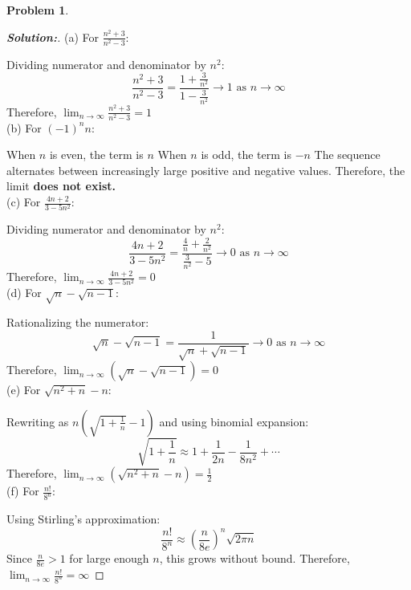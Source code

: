 \documentclass[12pt]{article}
\theoremstyle{definition}\newtheorem{problem}{Problem}
\newenvironment{solution}{\begin{proof}[\bfseries\textup{Solution:}]}{\end{proof}}
\begin{document}
\newpage
\begin{problem}
\end{problem}
\begin{solution}
    
(a) For $\displaystyle \frac{n^2+3}{n^2-3}$:
    
Dividing numerator and denominator by $n^2$:
\[ \frac{n^2+3}{n^2-3} = \frac{1 + \frac{3}{n^2}}{1 - \frac{3}{n^2}} \to 1 \text{ as } n \to \infty \]
Therefore, $\lim_{n \to \infty} \frac{n^2+3}{n^2-3} = 1$
\\

(b) For $(-1)^n n$:

When $n$ is even, the term is $n$
When $n$ is odd, the term is $-n$
The sequence alternates between increasingly large positive and negative values.
Therefore, the limit \textbf{does not exist.}
\\

(c) For $\displaystyle \frac{4n+2}{3-5n^2}$:

Dividing numerator and denominator by $n^2$:
\[ \frac{4n+2}{3-5n^2} = \frac{\frac{4}{n} + \frac{2}{n^2}}{\frac{3}{n^2} - 5} \to 0 \text{ as } n \to \infty \]
Therefore, $\lim_{n \to \infty} \frac{4n+2}{3-5n^2} = 0$
\\

(d) For $\sqrt{n}-\sqrt{n-1}$:

Rationalizing the numerator:
\[ \sqrt{n}-\sqrt{n-1} = \frac{1}{\sqrt{n}+\sqrt{n-1}} \to 0 \text{ as } n \to \infty \]
Therefore, $\lim_{n \to \infty} (\sqrt{n}-\sqrt{n-1}) = 0$
\\

(e) For $\sqrt{n^2+n}-n$:

Rewriting as $n(\sqrt{1+\frac{1}{n}}-1)$ and using binomial expansion:
\[ \sqrt{1+\frac{1}{n}} \approx 1 + \frac{1}{2n} - \frac{1}{8n^2} + \cdots \]
Therefore, $\lim_{n \to \infty} (\sqrt{n^2+n}-n) = \frac{1}{2}$
\\

(f) For $\frac{n!}{8^n}$:

Using Stirling's approximation:
\[ \frac{n!}{8^n} \approx \left(\frac{n}{8e}\right)^n\sqrt{2\pi n} \]
Since $\frac{n}{8e} > 1$ for large enough $n$, this grows without bound.
Therefore, $\lim_{n \to \infty} \frac{n!}{8^n} = \infty$
\end{solution}
\end{document}
